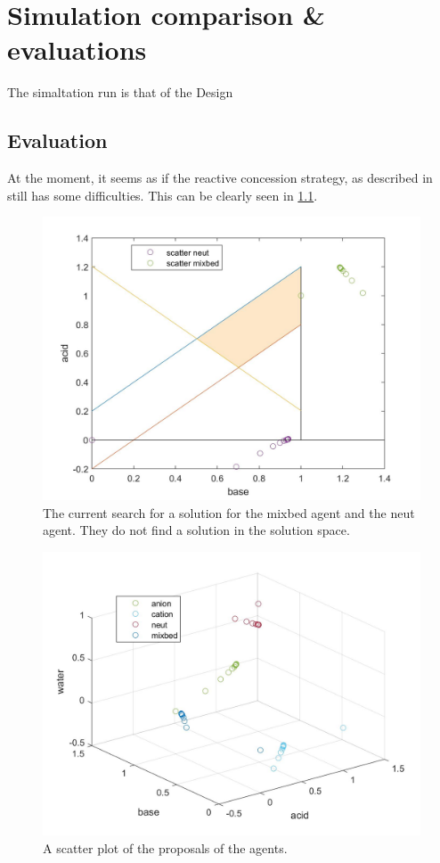 \chapter{Simulation comparison \& evaluations}
The simaltation run is that of the Design

\section{Evaluation}
At the moment, it seems as if the reactive concession strategy, as described in \citet{zheng2015automated} still has some difficulties. This can be clearly seen in \cref{fig:solution-mixbed-neut}. 
\begin{figure}[h]
	\centering
	\includegraphics[width=0.7\linewidth]{"img/solution mixbed neut"}
	\caption{The current search for a solution for the mixbed agent and the neut agent. They do not find a solution in the solution space.}
	\label{fig:solution-mixbed-neut}
\end{figure}

\begin{figure}[h]
	\centering
	\includegraphics[width=0.7\linewidth]{img/scatter_of_proposals}
	\caption{A scatter plot of the proposals of the agents.}
	\label{fig:scatterofproposals}
\end{figure}


